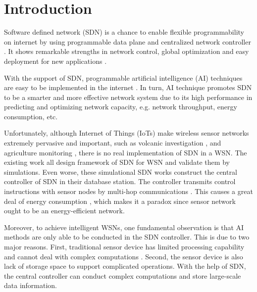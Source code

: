 \section{Introduction}


Software defined network (SDN) \cite{Benzekki2016Software,Sezer2013Are}
is a chance to enable flexible programmability on internet 
by using programmable data plane and centralized network controller \cite{7122247}.
It shows remarkable strengths in network control, global optimization
and easy deployment for new applications \cite{Feamster2014The}.

With the support of SDN, programmable artificial intelligence (AI) techniques
\cite{Norvig1995Artificial, Poole2010Artificial, Cockburn1996ARCHON} 
are easy to be implemented in the internet \cite{}.
In turn, AI technique promotes SDN to be a smarter and more effective network system
due to its high performance in predicting and optimizing network capacity\cite{},
e.g. network throughput, energy consumption, etc.
 
Unfortunately, although Internet of Things (IoTs) \cite{Atzori2010The} 
make wireless sensor networks \cite{Potdar2009Wireless}
extremely pervasive and important, such as volcanic investigation 
\cite{Wernerallen2006Deploying}, and agriculture monitoring \cite{Wang2010L3SN}, 
there is no real implementation of SDN in a WSN. The existing work 
 \cite{mahmud2011exploitation, costanzo2012software, luo2012sensor, de2015tinysdn, galluccio2015sdn} 
all design framework of SDN for WSN and validate them by simulations.  
Even worse, these simulational SDN works construct the central controller 
of SDN in their database station. The controller transmits control 
instructions with sensor nodes by multi-hop communications \cite{Mizuyama2017Estimation}.
This causes a great deal of energy consumption \cite{Yang2014}, which 
makes it a paradox since sensor network ought to be an energy-efficient network.

Moreover, to achieve intelligent WSNs, 
one fundamental observation is that AI methods 
are only able to be conducted in the SDN controller. 
This is due to two major reasons. 
First, traditional sensor device 
has limited processing capability and cannot 
deal with complex computations \cite{Sharma2012Security,Heller2012The}.
Second, the sensor device is also lack of storage space 
to support complicated operations. With the help of SDN, 
the central controller can conduct complex computations 
and store large-scale data information.

